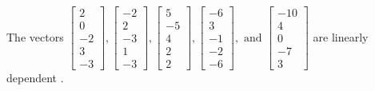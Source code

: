 \begin{exercise}
\begin{exerciseStatement}
  \end{exerciseStatement}
  \begin{exerciseAnswer}
   The vectors \(\left[\begin{array}{r}
2 \\
0 \\
-2 \\
3 \\
-3
\end{array}\right] , \left[\begin{array}{r}
-2 \\
2 \\
-3 \\
1 \\
-3
\end{array}\right] , \left[\begin{array}{r}
5 \\
-5 \\
4 \\
2 \\
2
\end{array}\right] , \left[\begin{array}{r}
-6 \\
3 \\
-1 \\
-2 \\
-6
\end{array}\right] , \text{ and } \left[\begin{array}{r}
-10 \\
4 \\
0 \\
-7 \\
3
\end{array}\right]\) are 
  	 linearly dependent  .
  


  \end{exerciseAnswer}
\end{exercise}